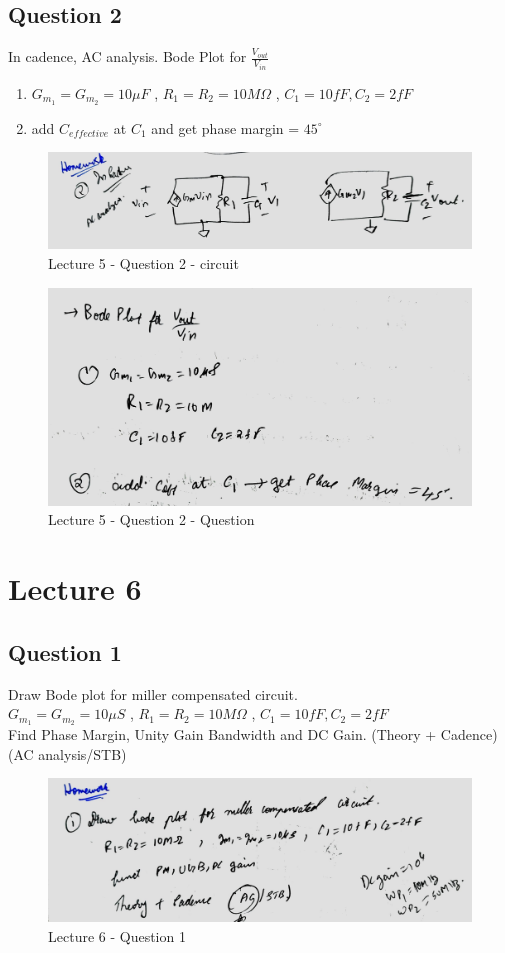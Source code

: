 \documentclass[a4paper]{article}
\begin{document}
\subsection{Question 2}
In cadence, AC analysis. Bode Plot for $\frac{V_{out}}{V_{{in}}}$
\begin{enumerate}
    \item $G_{m_1} = G_{m_2} = 10 \mu F$ , $R_1 = R_2 = 10M \Omega$ , $C_1 = 10fF, C_2 = 2fF$
    \item add $C_{effective}$ at $C_1$ and get phase margin = $45^\circ$
\end{enumerate}
\begin{figure}
    \centering
    \includegraphics[width=0.8\linewidth]{images/Lec_5_Q_2_ckt.jpeg}
    \caption{Lecture 5 - Question 2 - circuit}
\end{figure}
\begin{figure}
    \centering
    \includegraphics[width=1\linewidth]{images/Lec_5_Q_2_ques.jpeg}
    \caption{Lecture 5 - Question 2 - Question}
\end{figure}
\section{Lecture 6}
\subsection{Question 1}
Draw Bode plot for miller compensated circuit. \\ $G_{m_1} = G_{m_2} = 10 \mu S$ , $R_1 = R_2 = 10M \Omega$ , $C_1 = 10fF, C_2 = 2fF$ \\ Find Phase Margin, Unity Gain Bandwidth and DC Gain. (Theory + Cadence) (AC analysis/STB)
\begin{figure}
    \centering
    \includegraphics[width=0.8\linewidth]{images/Lec_6_Q_1.jpeg}
    \caption{Lecture 6 - Question 1}
\end{figure}
\end{document}
